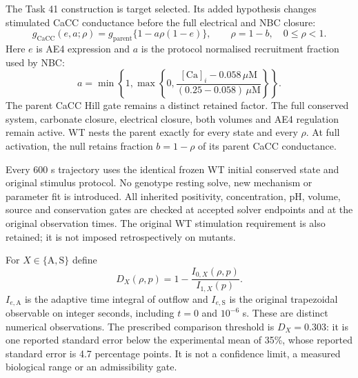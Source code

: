 The Task 41 construction is target selected. Its added hypothesis changes
stimulated CaCC conductance before the full electrical and NBC closure:
\begin{equation}
 g_{\mathrm{CaCC}}(e,a;\rho)
 =g_{\mathrm{parent}}\{1-a\rho(1-e)\},\qquad
 \rho=1-b,\quad 0\leq\rho<1.
 \label{m44eq:inversefamily}
\end{equation}
Here $e$ is AE4 expression and $a$ is the protocol normalised recruitment
fraction used by NBC:
\[
 a=\min\!\left\{1,\max\!\left\{0,
 \frac{[\mathrm{Ca}]_i-0.058\,\mu\mathrm M}{(0.25-0.058)\,\mu\mathrm M}
 \right\}\right\}.
\]
The parent CaCC Hill gate remains a distinct retained factor.
The full conserved system, carbonate closure, electrical closure, both
volumes and AE4 regulation remain active. WT nests the parent exactly for
every state and every $\rho$. At full activation, the null retains fraction
$b=1-\rho$ of its parent CaCC conductance.

Every 600 s trajectory uses the identical frozen WT initial conserved state
and original stimulus protocol. No genotype resting solve, new mechanism or
parameter fit is introduced. All inherited positivity, concentration, pH,
volume, source and conservation gates are checked at accepted solver endpoints
and at the original observation times. The original WT stimulation requirement
is also retained; it is not imposed retrospectively on mutants.

For $X\in\{\mathrm{A},\mathrm{S}\}$ define
\begin{equation}
 D_X(\rho,p)=1-\frac{I_{0,X}(\rho,p)}{I_{1,X}(p)}.
 \label{m44eq:inverseobservable}
\end{equation}
$I_{e,\mathrm A}$ is the adaptive time integral of outflow and
$I_{e,\mathrm S}$ is the original trapezoidal observable on integer seconds,
including $t=0$ and $10^{-6}$ s. These are distinct numerical observations.
The prescribed comparison threshold is $D_X=0.303$: it is one reported
standard error below the experimental mean of 35\%, whose reported standard
error is 4.7 percentage points. It is not a confidence limit, a measured
biological range or an admissibility gate.

